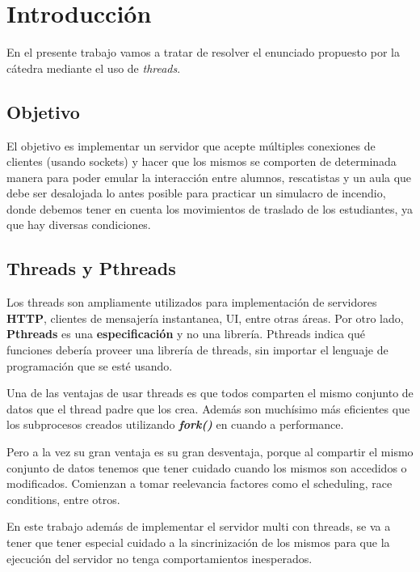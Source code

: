 \section{Introducci\'on}
En el presente trabajo vamos a tratar de resolver el enunciado propuesto por la c\'atedra mediante el uso de \emph{threads}.

\subsection{Objetivo}
El objetivo es implementar un servidor que acepte m\'ultiples conexiones de clientes (usando sockets) y hacer que los mismos se comporten de determinada manera para poder emular la interacci\'on entre alumnos, rescatistas y un aula que debe ser desalojada lo antes posible para practicar un simulacro de incendio, donde debemos tener en cuenta los movimientos de traslado de los estudiantes, ya que hay diversas condiciones.

\subsection{Threads y Pthreads}
Los threads son ampliamente utilizados para implementaci\'on de servidores \textbf{HTTP}, clientes de mensajer\'ia instantanea, UI, entre otras \'areas. Por otro lado, \textbf{Pthreads} es una \textbf{especificaci\'on} y no una librer\'ia. Pthreads indica qu\'e funciones deber\'ia proveer una librer\'ia de threads, sin importar el lenguaje de programaci\'on que se est\'e usando.


Una de las ventajas de usar threads es que todos comparten el mismo conjunto de datos que el thread padre que los crea. Adem\'as son much\'isimo m\'as eficientes que los subprocesos creados utilizando \textbf{\emph{fork()}} en cuando a performance.

Pero a la vez su gran ventaja es su gran desventaja, porque al compartir el mismo conjunto de datos tenemos que tener cuidado cuando los mismos son accedidos o modificados. Comienzan a tomar reelevancia factores como el scheduling, race conditions, entre otros.

En este trabajo adem\'as de implementar el servidor multi con threads, se va a tener que tener especial cuidado a la sincrinizaci\'on de los mismos para que la ejecuci\'on del servidor no tenga comportamientos inesperados.